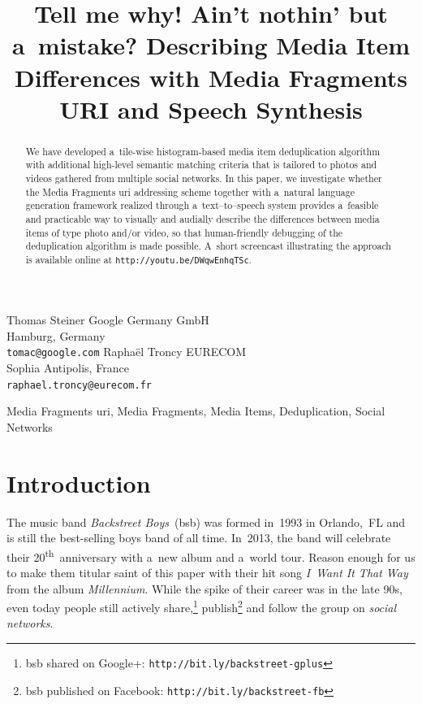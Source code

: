 \documentclass{article}
\begin{document}
\sloppy

\newcommand{\ts}{\textsuperscript}

\title{Tell me why! Ain't nothin' but a~mistake? Describing Media Item Differences with Media Fragments URI and Speech Synthesis}

\twoauthors
  {Thomas Steiner}
	{Google Germany GmbH\\
	Hamburg, Germany\\
    \texttt{tomac@google.com}}
  {Raphaël Troncy}
	{EURECOM\\
    Sophia Antipolis, France\\
	\texttt{raphael.troncy@eurecom.fr}}

\maketitle


\begin{abstract}
We have developed a~tile-wise histogram-based media item deduplication algorithm with additional high-level semantic matching criteria that is tailored to photos and videos gathered from multiple social networks. In this paper, we investigate whether the Media Fragments {\sc uri} addressing scheme together with a~natural language generation framework realized through a~text--to--speech system provides a~feasible and practicable way to visually and audially describe the differences between media items of type photo and/or video, so that human-friendly debugging of the deduplication algorithm is made possible. A~short screencast illustrating the approach is available online at \texttt{http://youtu.be/DWqwEnhqTSc}.
\end{abstract}

\begin{keywords}
Media Fragments {\sc uri}, Media Fragments, Media Items, Deduplication, Social Networks
\end{keywords}


\section{Introduction}
\label{sec:introduction}
The music band \emph{Backstreet Boys}~({\sc bsb}) was formed in~1993 in Orlando,~FL and is still the best-selling boys band of all time. In~2013, the band will celebrate their 20\ts{th}~anniversary with a~new album and a~world tour. Reason enough for us to make them titular saint of this paper with their hit song \emph{I~Want It That Way} from the album \emph{Millennium}. While the spike of their career was in the late 90s, even today people still actively share,\footnote{{\sc bsb} shared on Google+: \texttt{http://bit.ly/backstreet-gplus}} publish\footnote{{\sc bsb} published on Facebook: \texttt{http://bit.ly/backstreet-fb}} and follow the group on \emph{social networks}.
\end{document}
